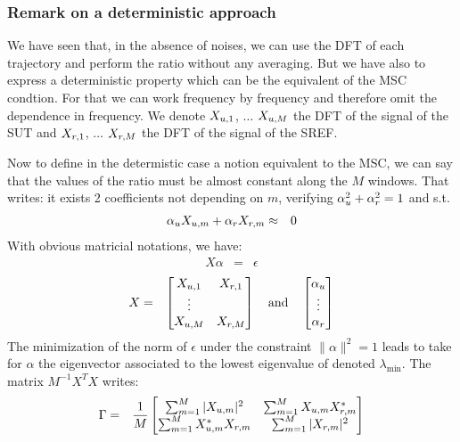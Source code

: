 
\subsubsection{Remark on a deterministic approach}
\label{ann:deterministic-approach}
We have seen that, in the absence of noises, we can use the DFT of each trajectory and perform the ratio without any averaging. But we have also to express a deterministic property which can be the equivalent of the MSC condtion. For that we can work frequency by frequency and therefore omit the dependence in frequency. We denote $X_{{u},1}$, $\ldots$ 
 $X_{{u},M}$ the DFT of the signal of the SUT and $X_{{r},1}$, $\ldots$ 
 $X_{{r},M}$ the DFT of the signal of the SREF.

Now to define in the determistic case a notion equivalent to the MSC, we can say that the values of the ratio must be almost constant along the $M$ windows. That writes: it exists 2 coefficients   not depending on $m$, verifying $\alpha_{{u}}^2+\alpha_{{r}}^2=1$ and s.t. 
\begin{eqnarray} 
\label{eq:approx}
 \alpha_{{u}}X_{{u},m}+\alpha_{{r}}X_{{r},m}&\approx &0
\end{eqnarray}
With obvious matricial notations, we have:
\begin{eqnarray*}
 X \alpha &=& \epsilon
\end{eqnarray*}
\begin{eqnarray*}
X & = &
\begin{bmatrix}
X_{{u},1}&X_{{r},1}
\\
\vdots
\\
X_{{u},M}&X_{{r},M}
\end{bmatrix} 
\quad\mathrm{and}\quad
\begin{bmatrix} 
\alpha_{{u}}
\\
\vdots
\\
\alpha_{{r}}
\end{bmatrix} 
\end{eqnarray*}
The minimization of the norm of $\epsilon$ under the constraint $\|\alpha\|^2=1$ leads to take for $\alpha$ the eigenvector associated to the lowest eigenvalue of denoted $\lambda_{\min}$. The matrix $M^{-1}X^TX$  writes:
\begin{eqnarray*}
\Gamma&=&\frac{1}{M}
 \begin{bmatrix}
\sum_{m=1}^M |X_{{u},m}|^2&\sum_{m=1}^M X_{{u},m}X_{{r},m}^*
\\
\sum_{m=1}^M X_{{u},m}^*X_{{r},m}&\sum_{m=1}^M |X_{{r},m}|^2
\end{bmatrix}
\end{eqnarray*}

